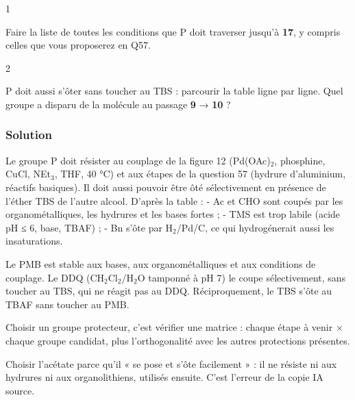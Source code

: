 \documentclass[11pt,a4paper]{article}
\newcommand{\equationajustee}[1]{%
  \sbox{\boiteequation}{$\displaystyle #1$}%
  \ifdim\wd\boiteequation>\linewidth
    \[\resizebox{\linewidth}{!}{\usebox{\boiteequation}}\]%
  \else
    \[#1\]%
  \fi}
\begin{document}
\begin{indication}{1}

Faire la liste de toutes les conditions que P doit traverser jusqu'à \textbf{17}, y compris celles que vous proposerez en Q57.

\end{indication}

\begin{indication}{2}

P doit aussi s'ôter sans toucher au TBS : parcourir la table ligne par ligne. Quel groupe a disparu de la molécule au passage \textbf{9} → \textbf{10} ?

\end{indication}

\hypertarget{solution-51}{%
\subsubsection{Solution}\label{solution-51}}

Le groupe P doit résister au couplage de la figure 12 (Pd(OAc)\(_2\), phosphine, CuCl, NEt\(_3\), THF, 40 °C) et aux étapes de la question 57 (hydrure d'aluminium, réactifs basiques). Il doit aussi pouvoir être ôté sélectivement en présence de l'éther TBS de l'autre alcool. D'après la table :
- Ac et CHO sont coupés par les organométalliques, les hydrures et les bases fortes ;
- TMS est trop labile (acide pH ≤ 6, base, TBAF) ;
- Bn s'ôte par H\(_2\)/Pd/C, ce qui hydrogénerait aussi les insaturations.

\equationajustee{\boxed{P=\mathrm{PMB}\ :\ \mathrm{PMBCl,\ NaH,\ THF,\ 20\ °C,\ 12\ h}}}

Le PMB est stable aux bases, aux organométalliques et aux conditions de couplage. Le DDQ (CH\(_2\)Cl\(_2\)/H\(_2\)O tamponné à pH 7) le coupe sélectivement, sans toucher au TBS, qui ne réagit pas au DDQ. Réciproquement, le TBS s'ôte au TBAF sans toucher au PMB.

\begin{methode}

Choisir un groupe protecteur, c'est vérifier une matrice : chaque étape à venir × chaque groupe candidat, plus l'orthogonalité avec les autres protections présentes.

\end{methode}

\begin{piege}

Choisir l'acétate parce qu'il « se pose et s'ôte facilement » : il ne résiste ni aux hydrures ni aux organolithiens, utilisés ensuite. C'est l'erreur de la copie IA source.

\end{piege}
\end{document}
